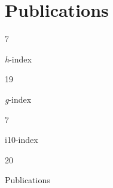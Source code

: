 \documentclass[11pt,a4paper,]{awesome-cv}
\begin{document}
\hypertarget{publications}{%
\section{Publications}\label{publications}}

\begin{tcolorbox}[enhanced,
        on line, 
        boxsep=4pt, left=0pt,right=0pt,top=0pt,bottom=0pt,
        colframe=white,colback=violet,
        hyperurl={https://scholar.google.com/citations?user=XgNEpfgAAAAJ}]
  
\color{white}
  \begin{minipage}[c]{0.245\linewidth}
    \begin{center} 
      \begin{huge} 7 \end{huge}
     \begin{small} \textit{h}-index \end{small} 
    \end{center} 
  \end{minipage} 
  \begin{minipage}[c]{0.245\linewidth}
    \begin{center} 
      \begin{huge} 19 \end{huge}
      \begin{small} \textit{g}-index \end{small} 
    \end{center}
  \end{minipage} 
  \begin{minipage}[c]{0.245\linewidth}
    \begin{center} 
      \begin{huge} 7 \end{huge}
      \begin{small} i10-index \end{small} 
    \end{center}
  \end{minipage} 
  \begin{minipage}[c]{0.245\linewidth}
    \begin{center}  
      \begin{huge} 20 \end{huge}
      \begin{small} Publications \end{small} 
    \end{center}
  \end{minipage} 
  

\end{tcolorbox}
\end{document}
